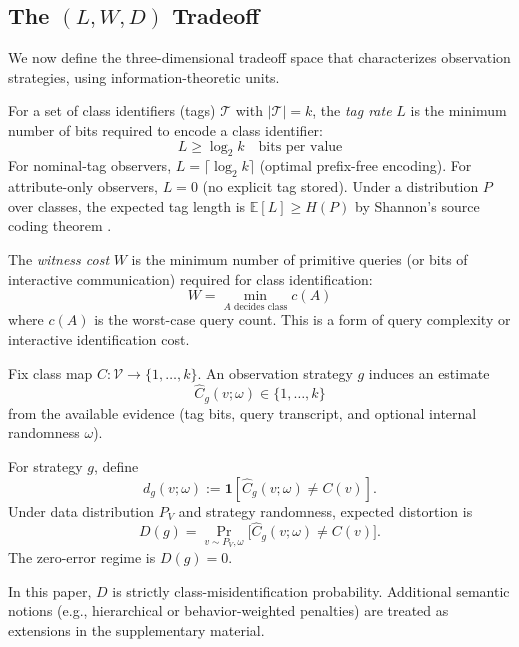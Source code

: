 \subsection{\texorpdfstring{The $(L, W, D)$ Tradeoff}{The (L, W, D) Tradeoff}}

We now define the three-dimensional tradeoff space that characterizes observation strategies, using information-theoretic units.

\begin{definition}
For a set of class identifiers (tags) $\mathcal{T}$ with $|\mathcal{T}| = k$, the \emph{tag rate} $L$ is the minimum number of bits required to encode a class identifier:
\[
L \geq \log_2 k \quad \text{bits per value}
\]
For nominal-tag observers, $L = \lceil \log_2 k \rceil$ (optimal prefix-free encoding). For attribute-only observers, $L = 0$ (no explicit tag stored). Under a distribution $P$ over classes, the expected tag length is $\mathbb{E}[L] \geq H(P)$ by Shannon's source coding theorem \cite{shannon1959coding}.
\end{definition}

\begin{definition}
The \emph{witness cost} $W$ is the minimum number of primitive queries (or bits of interactive communication) required for class identification:
\[
W = \min_{A \text{ decides class}} c(A)
\]
where $c(A)$ is the worst-case query count. This is a form of query complexity \cite{buhrman2002complexity} or interactive identification cost.
\end{definition}

\begin{definition}
Fix class map $C : \mathcal{V}\to\{1,\ldots,k\}$. An observation strategy $g$ induces an estimate
\[
\hat{C}_g(v;\omega) \in \{1,\ldots,k\}
\]
from the available evidence (tag bits, query transcript, and optional internal randomness $\omega$).
\end{definition}

\begin{definition}
For strategy $g$, define
\[
d_g(v;\omega) := \mathbf{1}\!\left[\hat{C}_g(v;\omega)\neq C(v)\right].
\]
Under data distribution $P_V$ and strategy randomness, expected distortion is
\[
D(g)=\Pr_{v\sim P_V,\omega}\!\big[\hat{C}_g(v;\omega)\neq C(v)\big].
\]
The zero-error regime is $D(g)=0$.
\end{definition}

\begin{remark}[Interpretation]
In this paper, $D$ is strictly class-misidentification probability. Additional semantic notions (e.g., hierarchical or behavior-weighted penalties) are treated as extensions in the supplementary material.
\end{remark}

